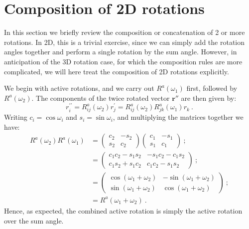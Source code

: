 \section{Composition of 2D rotations}
In this section we briefly review the composition or concatenation of 2 or more rotations.  In 2D, this is a trivial exercise, since we can simply add the rotation angles together and perform a single rotation by the sum angle.  However, in anticipation of the 3D rotation case, for which the composition rules are more complicated, we will here treat the composition of 2D rotations explicitly.

We begin with active rotations, and we carry out $R^a(\omega_1)$ first, followed by $R^a(\omega_2)$.  The components of the twice rotated vector $\mathbf{r}''$ are then given by:
\[
	r^{\prime\prime}_i = R^a_{ij}(\omega_2)r^{\prime}_j = R^a_{ij}(\omega_2)R^a_{jk}(\omega_1)r_k\ .
\]
Writing $c_i=\cos\omega_i$ and $s_i=\sin\omega_i$, and multiplying the matrices together we have:
\begin{align*}
	R^a(\omega_2)R^a(\omega_1) & = 
	\left(\begin{array}{cc} c_2 & -s_2\\ s_2 & c_2\end{array}\right)
	\left(\begin{array}{cc} c_1 & -s_1\\ s_1 & c_1\end{array}\right)\ ;\\
	&=
	\left(\begin{array}{cc} c_1c_2-s_1s_2 &
	-s_1c_2 - c_1s_2\\
	c_1s_2+s_1c_2 &
	c_1c_2-s_1s_2\end{array}\right)\ ; \\
	&= 	\left(\begin{array}{cc} \cos(\omega_1+\omega_2) & -\sin(\omega_1+\omega_2)\\ 
	\sin(\omega_1+\omega_2) & \cos(\omega_1+\omega_2)\end{array}\right)\ ;\\
	&= R^a(\omega_1+\omega_2)\ .
\end{align*}
Hence, as expected, the combined active rotation is simply the active rotation over the sum angle.  

